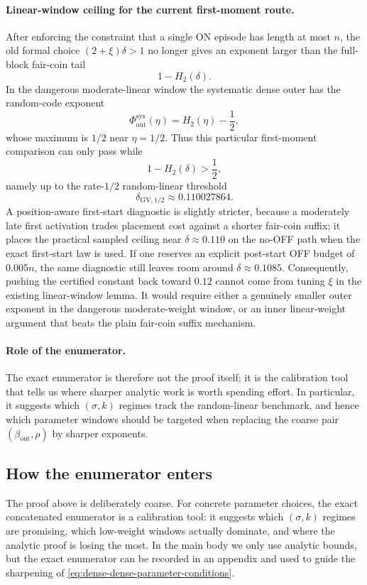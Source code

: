 \paragraph{Linear-window ceiling for the current first-moment route.}
After enforcing the constraint that a single ON episode has length at most \(n\), the old formal choice
\((2+\xi)\delta>1\) no longer gives an exponent larger than the full-block fair-coin tail
\[
1-H_2(\delta).
\]
In the dangerous moderate-linear window the systematic dense outer has the random-code exponent
\[
\Phi_{\mathrm{out}}^{\mathrm{sys}}(\eta)=H_2(\eta)-\frac12,
\]
whose maximum is \(1/2\) near \(\eta=1/2\). Thus this particular first-moment comparison can only pass while
\[
1-H_2(\delta)> \frac12,
\]
namely up to the rate-\(1/2\) random-linear threshold
\[
\delta_{\mathrm{GV},1/2}\approx 0.110027864.
\]
A position-aware first-start diagnostic is slightly stricter, because a moderately late first activation trades
placement cost against a shorter fair-coin suffix; it places the practical sampled ceiling near
\(\delta\approx 0.110\) on the no-OFF path when the exact first-start law is used. If one reserves an explicit
post-start OFF budget of \(0.005n\), the same diagnostic still leaves room around \(\delta\approx 0.1085\).
Consequently, pushing the certified constant back toward
\(0.12\) cannot come from tuning \(\xi\) in the existing linear-window lemma. It would require either a genuinely
smaller outer exponent in the dangerous moderate-weight window, or an inner linear-weight argument that beats the
plain fair-coin suffix mechanism.

\paragraph{Role of the enumerator.}
The exact enumerator is therefore not the proof itself; it is the calibration tool that tells us where sharper
analytic work is worth spending effort.
In particular, it suggests which \((\sigma,k)\) regimes track the random-linear benchmark, and hence which parameter
windows should be targeted when replacing the coarse pair \((\beta_{\mathrm{out}},\rho)\) by sharper exponents.

\subsection{How the enumerator enters}
\label{sec:integration-dense-dense-enumerator}

The proof above is deliberately coarse.
For concrete parameter choices, the exact concatenated enumerator is a calibration tool:
it suggests which \((\sigma,k)\) regimes are promising, which low-weight windows actually dominate,
and where the analytic proof is losing the most.
In the main body we only use analytic bounds, but the exact enumerator can be recorded in an appendix and used to guide
the sharpening of \eqref{eq:dense-dense-parameter-conditions}.

